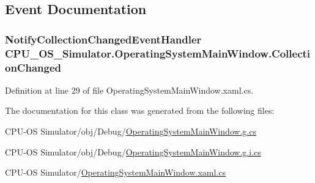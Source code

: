 \subsection{Event Documentation}
\hypertarget{class_c_p_u___o_s___simulator_1_1_operating_system_main_window_af8aeaf0c83021caf8f735ea7c051848c}{}
\subsubsection[{Collection\+Changed}]{\setlength{\rightskip}{0pt plus 5cm}Notify\+Collection\+Changed\+Event\+Handler C\+P\+U\+\_\+\+O\+S\+\_\+\+Simulator.\+Operating\+System\+Main\+Window.\+Collection\+Changed}\label{class_c_p_u___o_s___simulator_1_1_operating_system_main_window_af8aeaf0c83021caf8f735ea7c051848c}


Definition at line 29 of file Operating\+System\+Main\+Window.\+xaml.\+cs.



The documentation for this class was generated from the following files\+:\begin{DoxyCompactItemize}
\item 
C\+P\+U-\/\+O\+S Simulator/obj/\+Debug/\hyperlink{_debug_2_operating_system_main_window_8g_8cs}{Operating\+System\+Main\+Window.\+g.\+cs}\item 
C\+P\+U-\/\+O\+S Simulator/obj/\+Debug/\hyperlink{_debug_2_operating_system_main_window_8g_8i_8cs}{Operating\+System\+Main\+Window.\+g.\+i.\+cs}\item 
C\+P\+U-\/\+O\+S Simulator/\hyperlink{_operating_system_main_window_8xaml_8cs}{Operating\+System\+Main\+Window.\+xaml.\+cs}\end{DoxyCompactItemize}
